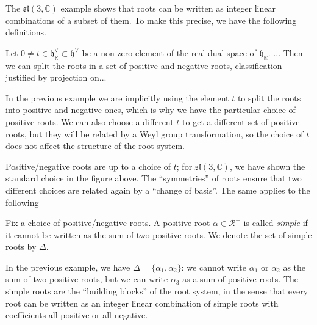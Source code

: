 The \(\mathfrak{sl}(3, \mathbb{C})\) example shows that roots can be written as integer linear combinations of a subset of them. To make this precise, we have the following definitions.


\begin{definition}
    Let \(0 \neq t \in \mathfrak{h}_\mathbb{R}^{\vee} \subset \mathfrak{h}^{\vee}\) be a non-zero element of the real dual space of \(\mathfrak{h}_\mathbb{R}\). ...
    Then we can split the roots in a set of positive and negative roots, classification justified by projection on...
\end{definition}

In the previous example we are implicitly using the element \(t\) to split the roots into positive and negative ones, which is why we have the particular choice of positive roots. We can also choose a different \(t\) to get a different set of positive roots, but they will be related by a Weyl group transformation, so the choice of \(t\) does not affect the structure of the root system.

Positive/negative roots are up to a choice of \(t\); for \(\mathfrak{sl}(3, \mathbb{C})\), we have shown the standard choice in the figure above. The “symmetries” of roots ensure that two different choices are related again by a “change of basis”. The same applies to the following
\begin{definition}
    Fix a choice of positive/negative roots. A positive root \(\alpha \in \mathcal{R}^+\) is called \textit{simple} if it cannot be written as the sum of two positive roots. We denote the set of simple roots by \(\Delta\).
\end{definition}

In the previous example, we have \(\Delta = \{\alpha_1, \alpha_2\}\): we cannot write \(\alpha_1\) or \(\alpha_2\) as the sum of two positive roots, but we can write \(\alpha_3\) as a sum of positive roots. The simple roots are the “building blocks” of the root system, in the sense that every root can be written as an integer linear combination of simple roots with coefficients all positive or all negative.

